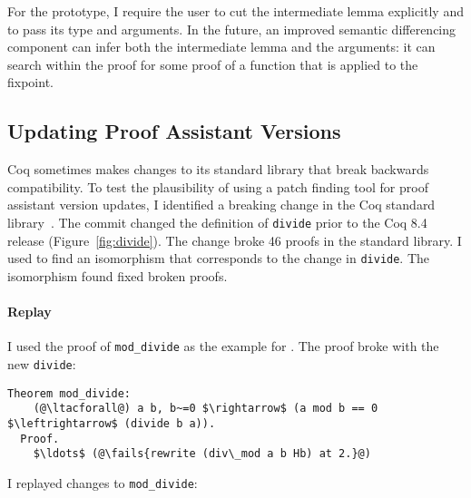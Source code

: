 For the prototype, I require the user to cut the intermediate lemma explicitly and to 
pass its type and arguments.
In the future, an improved semantic differencing component
can infer both the intermediate lemma and the arguments: it can search
within the proof for some proof of a function that is applied
to the fixpoint.

\begin{figure*}
\begin{minipage}{0.48\textwidth}
\lstset{language=coq, aboveskip=0pt,belowskip=0pt}

\end{minipage}
\hfill
\begin{minipage}{0.48\textwidth}
\lstset{language=coq, aboveskip=0pt,belowskip=0pt}

\end{minipage}
\caption[Caption for LOF]{Old (left) and new (right) definitions of \lstinline{divide} in Coq.}
\label{fig:divide}
\end{figure*}

\lstset{language=coq, aboveskip=3pt,belowskip=3pt}

\subsection{Updating Proof Assistant Versions}
\label{sec:coq}

Coq sometimes makes changes to its standard library that break
backwards compatibility.
To test the plausibility of using a patch finding tool for proof assistant version updates,
I identified a breaking change in the Coq standard library~\cite{coq84commit}.
The commit changed the definition of \lstinline{divide} prior to the Coq 8.4 release (Figure~\ref{fig:divide}).
The change broke 46 proofs in the standard library.
I used \sysname to find an isomorphism that corresponds to the change in \lstinline{divide}.
The isomorphism \sysname found fixed broken proofs.

\paragraph{Replay} I used the proof of \lstinline{mod_divide} as the example for \sysname.
The proof broke with the new \lstinline{divide}:

\lstset{language=coq, aboveskip=3pt,belowskip=3pt}
\begin{lstlisting}[language=coq]
  Theorem mod_divide:
    (@\ltacforall@) a b, b~=0 $\rightarrow$ (a mod b == 0 $\leftrightarrow$ (divide b a)).
  Proof.
    $\ldots$ (@\fails{rewrite (div\_mod a b Hb) at 2.}@)
\end{lstlisting}
I replayed changes to \lstinline{mod_divide}:


